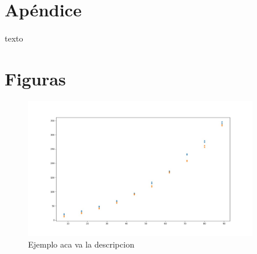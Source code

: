\documentclass{article}
\begin{document}
\section{Apéndice}
\paragraph{}
texto

\clearpage
\section{Figuras}
\begin{figure}[h]
\begin{center}
\includegraphics[width=4in]{./images/inputVsOutput.jpeg}
\caption{Ejemplo aca va la descripcion }
\label{grafico}
\end{center}
\end{figure}
\clearpage
\end{document}
